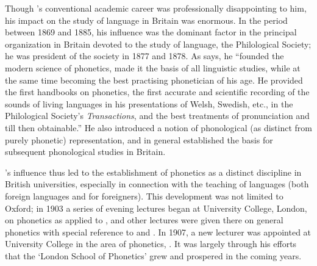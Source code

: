 Though {\Sweet}'s conventional academic career was professionally
disappointing to him, his impact on the study of language in Britain
was enormous. In the period between 1869 and 1885, his influence was
the dominant factor in the principal organization in Britain devoted
to the study of language, the Philological Society; he was president
of the society in 1877 and 1878. As \citet[197f.]{wrenn46:sweet} says,
he ``founded the modern science of phonetics, made it the basis of all
linguistic studies, while at the same time becoming the best
practising phonetician of his age. He provided the first handbooks on
phonetics, the first accurate and scientific recording of the sounds
of living languages in his presentations of Welsh, Swedish, etc., in
the Philological Society's \textsl{Transactions}, and the best
treatments of  pronunciation and  till then
obtainable.'' He also introduced a notion of phonological (as distinct
from purely phonetic) representation, and in general established the
basis for subsequent phonological studies in Britain.

{\Sweet}'s influence thus led to the establishment of phonetics as a
distinct discipline in British universities, especially in connection
with the teaching of languages (both foreign languages and  for
foreigners). This development was not limited to Oxford; in 1903 a
series of evening lectures began at University College, London, on
phonetics as applied to , and other lectures were given there on
general phonetics with special reference to  and . In
1907, a new lecturer was appointed at University College in the area
of phonetics, . It was largely through his efforts that
the `London School of Phonetics' grew and prospered in the coming
years.

